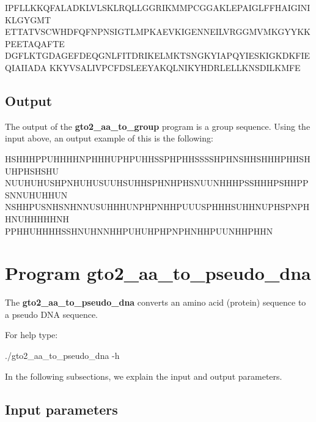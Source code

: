 \documentclass[11pt,]{krantz}
\newenvironment{Shaded}{\begin{snugshade}}{\end{snugshade}}
\newcommand{\ExtensionTok}[1]{#1}
\newcommand{\NormalTok}[1]{#1}
\begin{document}
\begin{Shaded}
\begin{Highlighting}[]
\ExtensionTok{IPFLLKKQFALADKLVLSKLRQLLGGRIKMMPCGGAKLEPAIGLFFHAIGINIKLGYGMT}
\ExtensionTok{ETTATVSCWHDFQFNPNSIGTLMPKAEVKIGENNEILVRGGMVMKGYYKKPEETAQAFTE}
\ExtensionTok{DGFLKTGDAGEFDEQGNLFITDRIKELMKTSNGKYIAPQYIESKIGKDKFIEQIAIIADA}
\ExtensionTok{KKYVSALIVPCFDSLEEYAKQLNIKYHDRLELLKNSDILKMFE}
\end{Highlighting}
\end{Shaded}

\subsection*{Output}\label{output-27}


The output of the \textbf{gto2\_aa\_to\_group} program is a group
sequence. Using the input above, an output example of this is the
following:

\begin{Shaded}
\begin{Highlighting}[]
\ExtensionTok{HSHHHPPUHHHHNPHHHUPHPUHHSSPHPHHSSSSHPHNSHHSHHHPHHSHUHPHSHSHU}
\ExtensionTok{NUUHUHUSHPNHUHUSUUHSUHHSPHNHPHSNUUNHHHPSSHHHPSHHPPSNNUHUHHUN}
\ExtensionTok{NSHHPUSNHSNHNNUSUHHHUNPHPNHHPUUUSPHHHSUHHNUPHSPNPHHNUHHHHHNH}
\ExtensionTok{PPHHUHHHHSSHNUHNNHHPUHUHPHPNPHNHHPUUNHHPHHN}
\end{Highlighting}
\end{Shaded}

\section{Program
gto2\_aa\_to\_pseudo\_dna}\label{program-gto2_aa_to_pseudo_dna}

The \textbf{gto2\_aa\_to\_pseudo\_dna} converts an amino acid (protein)
sequence to a pseudo DNA sequence.

For help type:

\begin{Shaded}
\begin{Highlighting}[]
\ExtensionTok{./gto2_aa_to_pseudo_dna}\NormalTok{ -h}
\end{Highlighting}
\end{Shaded}

In the following subsections, we explain the input and output
parameters.

\subsection*{Input parameters}\label{input-parameters-28}
\end{document}
